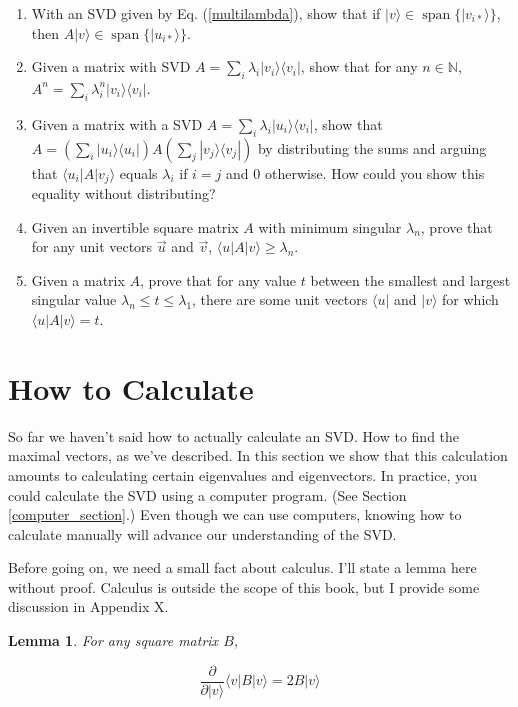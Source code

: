 \documentclass{amsbook}
\newtheorem{lemma}[theorem]{Lemma}
\begin{document}
\begin{enumerate}
\item With an SVD given by Eq. (\ref{multilambda}), show that if $|v\rangle\in\operatorname{span}\{|v_{i*}\rangle\}$, then $A|v\rangle\in\operatorname{span}\{|u_{i*}\rangle\}$.
\item Given a matrix with SVD $A=\sum_i\lambda_i|v_i\rangle\langle v_i|$, show that for any $n\in\mathbb N$, $A^n=\sum_i\lambda_i^n|v_i\rangle\langle v_i|$.
\item Given a matrix with a SVD $A=\sum_i\lambda_i|u_i\rangle\langle v_i|$, show that $A=\left(\sum_i|u_i\rangle\langle u_i|\right)A\left(\sum_j|v_j\rangle\langle v_j|\right)$ by distributing the sums and arguing that $\langle u_i|A|v_j\rangle$ equals $\lambda_i$ if $i=j$ and $0$ otherwise.  How could you show this equality without distributing?
\item Given an invertible square matrix $A$ with minimum singular $\lambda_n$, prove that for any unit vectors $\vec u$ and $\vec v$, $\langle u|A|v\rangle\geq\lambda_n$.
\item Given a matrix $A$, prove that for any value $t$ between the smallest and largest singular value $\lambda_n\leq t\leq\lambda_1$, there are some unit vectors $\langle u|$ and $|v\rangle$ for which $\langle u|A|v\rangle=t$.
\end{enumerate}

\section{How to Calculate}

So far we haven't said how to actually calculate an SVD.  How to find the maximal vectors, as we've described.  In this section we show that this calculation amounts to calculating certain eigenvalues and eigenvectors.  In practice, you could calculate the SVD using a computer program.  (See Section \ref{computer_section}.)  Even though we can use computers, knowing how to calculate manually will advance our understanding of the SVD.

Before going on, we need a small fact about calculus.  I'll state a lemma here without proof.  Calculus is outside the scope of this book, but I provide some discussion in Appendix X.

\begin{lemma}
\label{calc}
For any square matrix $B$,

$$
\frac{\partial}{\partial|v\rangle}\langle v|B|v\rangle = 2B|v\rangle
$$
\end{lemma}
\end{document}
